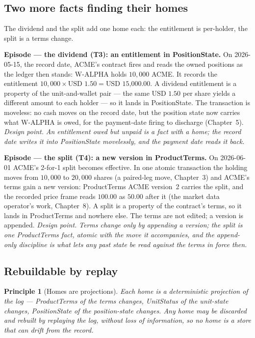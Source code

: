 \documentclass[11pt,a4paper]{article}
\newcommand{\USD}[1]{\mbox{USD~#1}}
\newtheorem{principle}[definition]{Principle}
\begin{document}
\subsection{Two more facts finding their homes}

The dividend and the split add one home each: the entitlement is per-holder, the split is a
terms change.

\medskip\noindent\textbf{Episode --- the dividend (T3): an entitlement in PositionState.}
On 2026-05-15, the record date, ACME's contract fires and reads the owned positions as the
ledger then stands: W-ALPHA holds $10{,}000$ ACME. It records the entitlement
$10{,}000\times\USD{1.50}=\USD{15{,}000.00}$. A dividend entitlement is a property of the
unit-and-wallet pair --- the same $\USD{1.50}$ per share yields a different amount to each
holder --- so it lands in PositionState. The transaction is moveless: no cash moves on the
record date, but the position state now carries what W-ALPHA is owed, for the payment-date
firing to discharge (Chapter~5).
\emph{Design point.} \emph{An entitlement owed but unpaid is a fact with a home; the record
date writes it into PositionState movelessly, and the payment date reads it back.}

\medskip\noindent\textbf{Episode --- the split (T4): a new version in ProductTerms.}
On 2026-06-01 ACME's 2-for-1 split becomes effective. In one atomic transaction the holding
moves from $10{,}000$ to $20{,}000$ shares (a paired-leg move, Chapter~3) and
ACME's terms gain a new version: ProductTerms ACME version~2 carries the split, and the
recorded price frame reads $100.00$ as $50.00$ after it (the market data operator's work,
Chapter~8). A split is a property of the contract's terms, so
it lands in ProductTerms and nowhere else. The terms are not edited; a version is appended.
\emph{Design point.} \emph{Terms change only by appending a version; the split is one
ProductTerms fact, atomic with the move it accompanies, and the append-only discipline is
what lets any past state be read against the terms in force then.}

\subsection{Rebuildable by replay}

\begin{principle}[Homes are projections]\label{prin:rebuildable}
Each home is a deterministic projection of the log --- ProductTerms of the terms changes,
UnitStatus of the unit-state changes, PositionState of the position-state changes. Any
home may be discarded and rebuilt by replaying the log, without loss of information, so no
home is a store that can drift from the record.
\end{principle}
\end{document}
